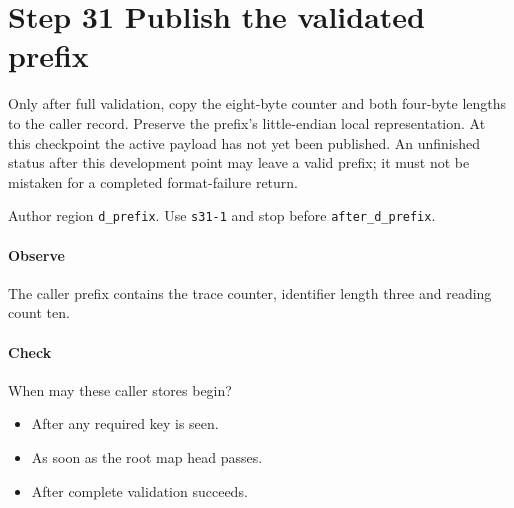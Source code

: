 \section{Step 31 Publish the validated prefix}\label{cbor-s31}
Only after full validation, copy the eight-byte counter and both four-byte lengths to the caller record. Preserve the prefix's little-endian local representation. At this checkpoint the active payload has not yet been published. An unfinished status after this development point may leave a valid prefix; it must not be mistaken for a completed format-failure return.

Author region \texttt{d\_prefix}. Use \texttt{s31-1} and stop before \texttt{after\_d\_prefix}. 

\paragraph{Observe} The caller prefix contains the trace counter, identifier length three and reading count ten.

\paragraph{Check} When may these caller stores begin?
\begin{itemize}
\item[A.] After any required key is seen.
\item[B.] As soon as the root map head passes.
\item[C.] After complete validation succeeds.
\end{itemize}
